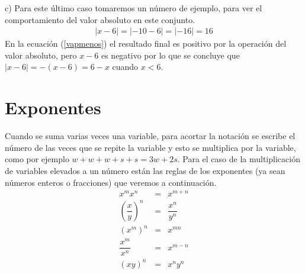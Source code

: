 \noindent c) Para este último caso tomaremos un número de ejemplo, para ver el comportamiento del valor absoluto en este conjunto.
\begin{eqnarray}
|x-6|=|-10-6|=|-16|=16  \label{vapmenos}
\end{eqnarray} 
En la ecuación (\ref{vapmenos}) el resultado final es positivo por la operación del valor absoluto, pero $x-6$ es negativo por lo que se concluye que $|x-6|=-(x-6)=6-x$ cuando $x<6$.

\section{Exponentes}
\label{exponentes}
Cuando se suma varias veces una variable, para acortar la notación se escribe el número de las veces que se repite la variable y esto se multiplica por la variable, como por ejemplo $w+w+w+s+s=3w+2s$. Para el caso de la multiplicación de variables elevados a un número están las reglas de los exponentes (ya sean números enteros o fracciones) que veremos a continuación.\\

\begin{eqnarray}
x^{m}x^{n}&=&x^{m+n}\\
\left(\dfrac{x}{y}\right)^{n}&=&\dfrac{x^{n}}{y^{n}}\\
(x^{m})^{n}&=&x^{mn}\\
\dfrac{x^{m}}{x^{n}}&=&x^{m-n}\\
(xy)^{n}&=&x^{n}y^{n}
\end{eqnarray}

